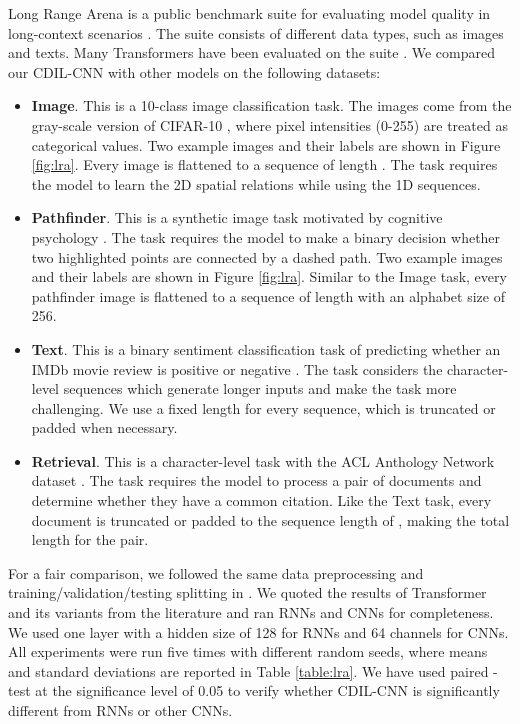 \documentclass{article}
\begin{document}
Long Range Arena is a public benchmark suite for evaluating model quality in long-context scenarios \cite{tay2020long}. The suite consists of different data types, such as images and texts. Many Transformers have been evaluated on the suite \cite{peng2021random, tay2020long, zhu2021long, xiong2021nystr}. We compared our CDIL-CNN with other models on the following datasets:
\begin{itemize}
    \item \textbf{Image}. This is a 10-class image classification task. The images come from the gray-scale version of CIFAR-10 \cite{krizhevsky2009learning}, where pixel intensities (0-255) are treated as categorical values. Two example images and their labels are shown in Figure \ref{fig:lra}. Every image is flattened to a sequence of length . The task requires the model to learn the 2D spatial relations while using the 1D sequences.
    
    \item \textbf{Pathfinder}. This is a synthetic image task motivated by cognitive psychology \cite{houtkamp2010parallel, linsley2018learning}. The task requires the model to make a binary decision whether two highlighted points are connected by a dashed path. Two example images and their labels are shown in Figure \ref{fig:lra}. Similar to the Image task, every pathfinder image is flattened to a sequence of length  with an alphabet size of 256.
    
    \item \textbf{Text}. This is a binary sentiment classification task of predicting whether an IMDb movie review is positive or negative \cite{maas2011learning}. The task considers the character-level sequences which generate longer inputs and make the task more challenging. We use a fixed length  for every sequence, which is truncated or padded when necessary.
    
    \item \textbf{Retrieval}. This is a character-level task with the ACL Anthology Network dataset \cite{radev2013acl}.  The task requires the model to process a pair of documents and determine whether they have a common citation. Like the Text task, every document is truncated or padded to the sequence length of , making the total length  for the pair.
\end{itemize}

For a fair comparison, we followed the same data preprocessing and training/validation/testing splitting in \cite{tay2020long}. We quoted the results of Transformer and its variants from the literature and ran RNNs and CNNs for completeness. We used one layer with a hidden size of 128 for RNNs and 64 channels for CNNs. All experiments were run five times with different random seeds, where means and standard deviations are reported in Table \ref{table:lra}. We have used paired -test at the significance level of 0.05 to verify whether CDIL-CNN is significantly different from RNNs or other CNNs.
\end{document}
